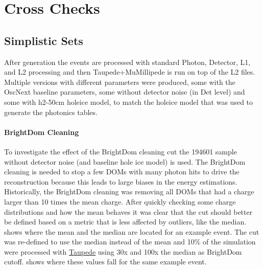 \section{Cross Checks}
\subsection{Simplistic Sets}


After generation the events are processed with standard Photon, Detector, L1, and L2 processing and then Taupede+MuMillipede is run on top of the L2 files. Multiple versions with different parameters were produced, some with the OscNext baseline parameters, some without detector noise (in Det level) and some with h2-50cm holeice model, to match the holeice model that was used to generate the photonics tables.


\paragraph{BrightDom Cleaning}

To investigate the effect of the BrightDom cleaning cut the 194601 sample without detector noise (and baseline hole ice model) is used. The BrightDom cleaning is needed to stop a few DOMs with many photon hits to drive the reconstruction because this leads to large biases in the energy estimations. Historically, the BrightDom cleaning was removing all DOMs that had a charge larger than 10 times the mean charge. After quickly checking some charge distributions and how the mean behaves it was clear that the cut should better be defined based on a metric that is less affected by outliers, like the median.  shows where the mean and the median are located for an example event. The cut was re-defined to use the median instead of the mean and 10\% of the simulation were processed with \href{https://github.com/LeanderFischer/I3_HNL_Decay/blob/a6838ec48e0a2d4f6547cbe064d2928ec55fb76d/submission_scripts/process/process_Taupede.py}{Taupede} using 30x and 100x the median as BrightDom cutoff.  shows where these values fall for the same example event.


